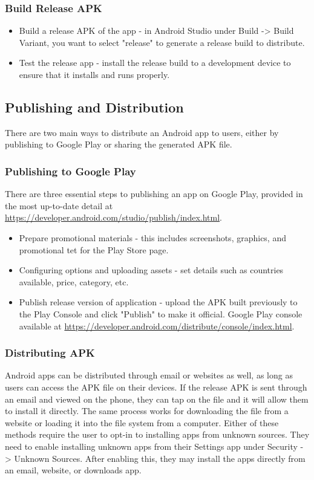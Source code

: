 \subsubsection{Build Release APK}
\begin{itemize}
    \item Build a release APK of the app - in Android Studio under Build -> Build Variant, you want to select "release" to generate a release build to distribute.
    \item Test the release app - install the release build to a development device to ensure that it installs and runs properly.
\end{itemize} 

\subsection{Publishing and Distribution}
There are two main ways to distribute an Android app to users, either by publishing to Google Play or sharing the generated APK file.
\subsubsection{Publishing to Google Play}
There are three essential steps to publishing an app on Google Play, provided in the most up-to-date detail at \url{https://developer.android.com/studio/publish/index.html}. 
\begin{itemize}
    \item Prepare promotional materials - this includes screenshots, graphics, and promotional tet for the Play Store page.
    \item Configuring options and uploading assets - set details such as countries available, price, category, etc.
    \item Publish release version of application - upload the APK built previously to the Play Console and click "Publish" to make it official. Google Play console available at \url{https://developer.android.com/distribute/console/index.html}.
\end{itemize}
\subsubsection{Distributing APK}
Android apps can be distributed through email or websites as well, as long as users can access the APK file on their devices. If the release APK is sent through an email and viewed on the phone, they can tap on the file and it will allow them to install it directly. The same process works for downloading the file from a website or loading it into the file system from a computer. Either of these methods require the user to opt-in to installing apps from unknown sources. They need to enable installing unknown apps from their Settings app under Security -> Unknown Sources. After enabling this, they may install the apps directly from an email, website, or downloads app.